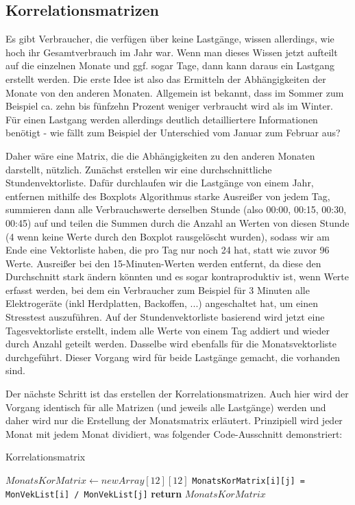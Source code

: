 
\subsection{Korrelationsmatrizen}

Es gibt Verbraucher, die verfügen über keine Lastgänge, wissen allerdings, wie hoch ihr Gesamtverbrauch im Jahr war. Wenn man dieses Wissen jetzt aufteilt auf die einzelnen Monate und ggf. sogar Tage, dann kann daraus ein Lastgang erstellt werden. Die erste Idee ist also das Ermitteln der Abhängigkeiten der Monate von den anderen Monaten. Allgemein ist bekannt, dass im Sommer zum Beispiel ca. zehn bis fünfzehn Prozent weniger verbraucht wird als im Winter. Für einen Lastgang werden allerdings deutlich detailliertere Informationen benötigt - wie fällt zum Beispiel der Unterschied vom Januar zum Februar aus? 

Daher wäre eine Matrix, die die Abhängigkeiten zu den anderen Monaten darstellt, nützlich. Zunächst erstellen wir eine durchschnittliche Stundenvektorliste. Dafür durchlaufen wir die Lastgänge von einem Jahr, entfernen mithilfe des Boxplots Algorithmus starke Ausreißer von jedem Tag, summieren dann alle Verbrauchswerte derselben Stunde (also 00:00, 00:15, 00:30, 00:45) auf und teilen die Summen durch die Anzahl an Werten von diesen Stunde (4 wenn keine Werte durch den Boxplot rausgelöscht wurden), sodass wir am Ende eine Vektorliste haben, die pro Tag nur noch 24 hat, statt wie zuvor 96 Werte. Ausreißer bei den 15-Minuten-Werten werden entfernt, da diese den Durchschnitt stark ändern könnten und es sogar kontraproduktiv ist, wenn Werte erfasst werden, bei dem ein Verbraucher zum Beispiel für 3 Minuten alle Elektrogeräte (inkl Herdplatten, Backoffen, ...) angeschaltet hat, um einen Stresstest auszuführen. Auf der Stundenvektorliste basierend wird jetzt eine Tagesvektorliste erstellt, indem alle Werte von einem Tag addiert und wieder durch Anzahl geteilt werden. Dasselbe wird ebenfalls für die Monatsvektorliste durchgeführt. Dieser Vorgang wird für beide Lastgänge gemacht, die vorhanden sind. 

Der nächste Schritt ist das erstellen der Korrelationsmatrizen. Auch hier wird der Vorgang identisch für alle Matrizen (und jeweils alle Lastgänge) werden und daher wird nur die Erstellung der Monatsmatrix erläutert. Prinzipiell wird jeder Monat mit jedem Monat dividiert, was folgender Code-Ausschnitt demonstriert:

\begin{algorithm}
	\caption{Korrelationsmatrix}\label{alg:euclid}
	\begin{algorithmic}[1]
		\State $MonatsKorMatrix\gets new Array[12][12]$
				\State \texttt{MonatsKorMatrix[i][j] = MonVekList[i] / MonVekList[j]}
			\EndFor
		\EndFor
		\State \textbf{return} $MonatsKorMatrix$
		\EndProcedure
	\end{algorithmic}
\end{algorithm}

